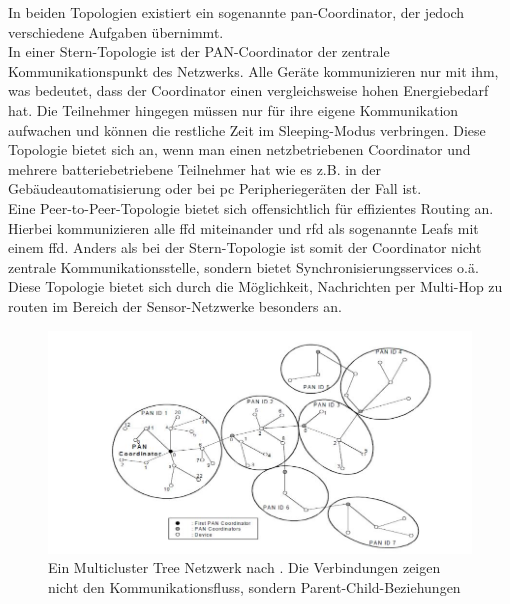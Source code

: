 In beiden Topologien existiert ein sogenannte \ac{pan}-Coordinator, der jedoch verschiedene Aufgaben übernimmt.\\
In einer Stern-Topologie ist der PAN-Coordinator der zentrale Kommunikationspunkt des Netzwerks. Alle Geräte kommunizieren nur mit ihm, was bedeutet, dass der Coordinator einen vergleichsweise hohen Energiebedarf hat. Die Teilnehmer hingegen müssen nur für ihre eigene Kommunikation aufwachen und können die restliche Zeit im Sleeping-Modus verbringen. Diese Topologie bietet sich an, wenn man einen netzbetriebenen Coordinator und mehrere batteriebetriebene Teilnehmer hat wie es z.B. in der Gebäudeautomatisierung oder bei \ac{pc} Peripheriegeräten der Fall ist.\\
Eine Peer-to-Peer-Topologie bietet sich offensichtlich für effizientes Routing an. Hierbei kommunizieren alle \ac{ffd} miteinander und \ac{rfd} als sogenannte Leafs mit einem \ac{ffd}. Anders als bei der Stern-Topologie ist somit der Coordinator nicht zentrale Kommunikationsstelle, sondern bietet Synchronisierungsservices o.ä. Diese Topologie bietet sich durch die Möglichkeit, Nachrichten per Multi-Hop zu routen im Bereich der Sensor-Netzwerke besonders an.\\
\begin{figure}
	\centering
	\includegraphics[width=\textwidth]{Grafiken-Alex/multicluster.jpg}
	\caption{Ein Multicluster Tree Netzwerk nach \cite[S.48]{ieee154}. Die Verbindungen zeigen nicht den Kommunikationsfluss, sondern Parent-Child-Beziehungen}
	\label{multicluster}
\end{figure}
